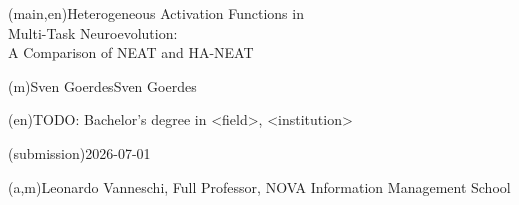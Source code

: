 
%


\nttitle(main,en){Heterogeneous Activation Functions in\\Multi-Task Neuroevolution:\\A Comparison of NEAT and HA-NEAT}%


\ntauthorname(m){Sven Goerdes}{Sven Goerdes}

\ntauthordegree(en){TODO: Bachelor's degree in <field>, <institution>}

\ntdate(submission){2026-07-01}

(a,m){Leonardo Vanneschi, Full Professor, NOVA Information Management School}

